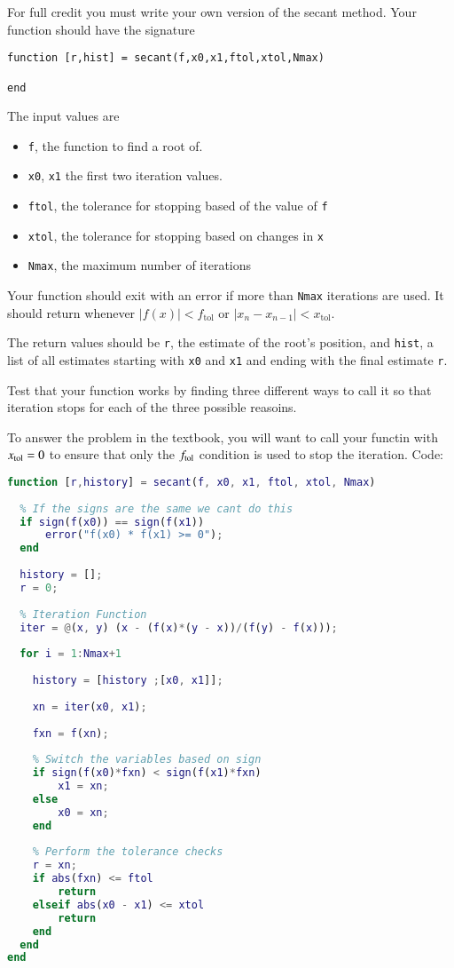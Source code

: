 \documentclass[12pt]{article}
\makeatletter
\theoremstyle{homework}
\newenvironment{exercise}[1]
{\def\@currentlabel{#1}\exercisecore}
{\endexercisecore}
\makeatother
\begin{document}
\begin{exercise}{Chapter 4: 2 (c)}
For full credit you must write your own version of the secant method.
Your function should have the signature

\begin{verbatim} 
function [r,hist] = secant(f,x0,x1,ftol,xtol,Nmax)

end
\end{verbatim}

The input values are
\begin{itemize}
\item \texttt{f}, the function to find a root of.
\item \texttt{x0}, \texttt{x1} the first two iteration values.
\item \texttt{ftol}, the tolerance for stopping based of the value of \texttt{f}
\item \texttt{xtol}, the tolerance for stopping based on changes in \texttt{x}
\item \texttt{Nmax}, the maximum number of iterations
\end{itemize}

Your function should exit with an error if more than \texttt{Nmax} iterations
are used.  It should return whenever $|f(x)|<f_{\text{tol}}$ or $|x_n-x_{n-1}|<x_{\text{tol}}$.

The return values should be \texttt{r}, the estimate of the root's position,
and \texttt{hist}, a list of all estimates starting with \texttt{x0} and \texttt{x1} and ending with the final estimate \texttt{r}.

Test that your function works by finding three different ways to call it
so that iteration stops for each of the three possible reasoins.

To answer the problem in the textbook, you will want to call your functin with 
$x_{\rm tol}=0$ to ensure that only the $f_{\rm tol}$ condition is used
to stop the iteration.
\end{exercise}
Code:
\begin{lstlisting}[language=Matlab]
function [r,history] = secant(f, x0, x1, ftol, xtol, Nmax)
    
  % If the signs are the same we cant do this
  if sign(f(x0)) == sign(f(x1))
      error("f(x0) * f(x1) >= 0");
  end
  
  history = [];
  r = 0;
  
  % Iteration Function
  iter = @(x, y) (x - (f(x)*(y - x))/(f(y) - f(x)));
  
  for i = 1:Nmax+1
      
    history = [history ;[x0, x1]];
    
    xn = iter(x0, x1);
    
    fxn = f(xn);
    
    % Switch the variables based on sign
    if sign(f(x0)*fxn) < sign(f(x1)*fxn)
        x1 = xn;
    else
        x0 = xn;
    end
    
    % Perform the tolerance checks
    r = xn;
    if abs(fxn) <= ftol
        return
    elseif abs(x0 - x1) <= xtol
        return
    end
  end
end
\end{lstlisting}
\end{document}
